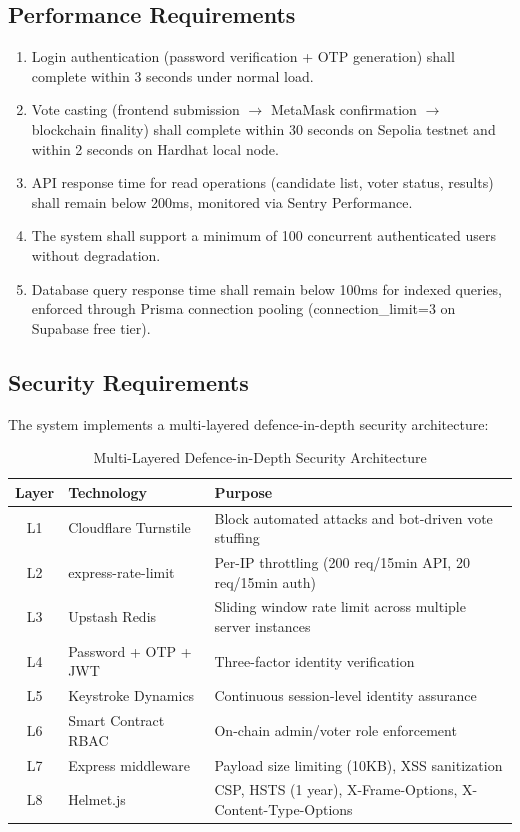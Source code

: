 \documentclass[oneside,a4paper,12pt]{book}
\begin{document}
\subsection{Performance Requirements}
\begin{enumerate}[leftmargin=1.5cm]
    \item Login authentication (password verification + OTP generation) shall complete within 3 seconds under normal load.
    \item Vote casting (frontend submission $\rightarrow$ MetaMask confirmation $\rightarrow$ blockchain finality) shall complete within 30 seconds on Sepolia testnet and within 2 seconds on Hardhat local node.
    \item API response time for read operations (candidate list, voter status, results) shall remain below 200ms, monitored via Sentry Performance.
    \item The system shall support a minimum of 100 concurrent authenticated users without degradation.
    \item Database query response time shall remain below 100ms for indexed queries, enforced through Prisma connection pooling (connection\_limit=3 on Supabase free tier).
\end{enumerate}

\subsection{Security Requirements}
The system implements a multi-layered defence-in-depth security architecture:

\begin{table}[htbp]
\centering
\renewcommand{\arraystretch}{1.3}
\small
\begin{tabularx}{\textwidth}{|c|p{3.5cm}|X|}
\hline
\textbf{Layer} & \textbf{Technology} & \textbf{Purpose} \\
\hline
L1 & Cloudflare Turnstile & Block automated attacks and bot-driven vote stuffing \\
\hline
L2 & express-rate-limit & Per-IP throttling (200 req/15min API, 20 req/15min auth) \\
\hline
L3 & Upstash Redis & Sliding window rate limit across multiple server instances \\
\hline
L4 & Password + OTP + JWT & Three-factor identity verification \\
\hline
L5 & Keystroke Dynamics & Continuous session-level identity assurance \\
\hline
L6 & Smart Contract RBAC & On-chain admin/voter role enforcement \\
\hline
L7 & Express middleware & Payload size limiting (10KB), XSS sanitization \\
\hline
L8 & Helmet.js & CSP, HSTS (1 year), X-Frame-Options, X-Content-Type-Options \\
\hline
\end{tabularx}
\caption{Multi-Layered Defence-in-Depth Security Architecture}
\label{tab:security_layers}
\end{table}
\end{document}
